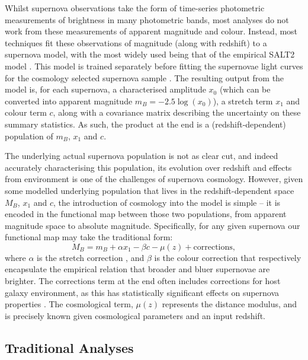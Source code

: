 \documentclass[a4paper,fleqn,usenatbib]{mnras}
\begin{document}
Whilst supernova observations take the form of time-series photometric measurements of brightness in many photometric bands, most analyses do not work from these measurements of apparent magnitude and colour. Instead, most techniques fit these observations of magnitude (along with redshift) to a supernova model, with the most widely used being that of the empirical SALT2 model \citep{Guy2007, Guy2010}. This model is trained separately before fitting the supernovae light curves for the cosmology selected supernova sample \citep{Guy2010, Mosher2014}. The resulting output from the model is, for each supernova, a characterised amplitude $x_0$ (which can be converted into apparent magnitude $m_B = -2.5\log(x_0)$), a stretch term $x_1$ and colour term $c$, along with a covariance matrix describing the uncertainty on these summary statistics. As such, the product at the end is a (redshift-dependent) population of $m_B$, $x_1$ and $c$.

The underlying actual supernova population is not as clear cut, and indeed accurately characterising this population, its evolution over redshift and effects from environment is one of the challenges of supernova cosmology. However, given some modelled underlying population that lives in the redshift-dependent space $M_B$, $x_1$ and $c$, the introduction of cosmology into the model is simple -- it is encoded in the functional map between those two populations, from apparent magnitude space to absolute magnitude. Specifically, for any given supernova our functional map may take the traditional form:
\begin{equation}
M_B = m_B + \alpha x_1 - \beta c - \mu(z) + \text{corrections},
\end{equation}
where $\alpha$ is the stretch correction \citep{Phillips1993}, and $\beta$ is the colour correction \citep{Tripp1998} that respectively encapsulate the empirical relation that broader and bluer supernovae are brighter. The $\text{corrections}$ term at the end often includes corrections for host galaxy environment, as this has statistically significant effects on supernova properties \citep{Kelly2010, Lampeitl2010, Sullivan2010, DAndrea2011, Gupta2011, Johansson2013, Rigault2013, Uddin2017}. The cosmological term, $\mu(z)$ represents the distance modulus, and is precisely known given cosmological parameters and an input redshift.

\subsection{Traditional Analyses}
\end{document}
